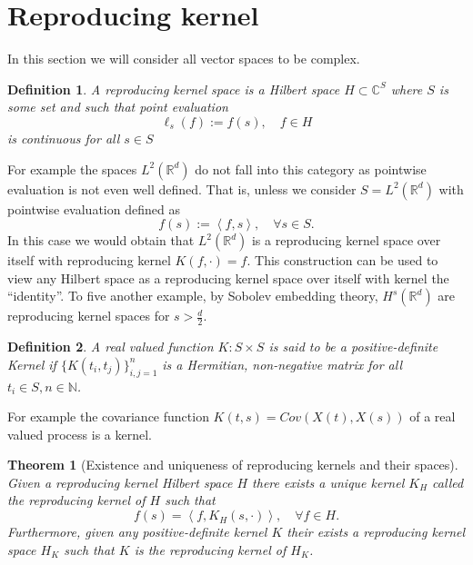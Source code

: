 \documentclass[12pt]{article}
\newcommand{\br}[1]{\left\langle#1\right\rangle}
\newcommand{\C}{\mathbb{C}}
\newcommand{\N}{\mathbb{N}}
\newcommand{\R}{{\mathbb R}}
\newtheorem{theorem}{Theorem}
\newtheorem{definition}{Definition}
\begin{document}
\section{Reproducing kernel}
In this section we will consider all vector spaces to be complex.
\begin{definition}
	A reproducing kernel space is a Hilbert space $H\subset \C^S$ where $S$ is some set and such that  point evaluation $$\ell _s(f):=f(s),\quad f\in H$$ is continuous for all $s\in S$
\end{definition}
For example the spaces $L^2(\R^d)$ do not fall into this category as pointwise evaluation is not even well defined. That is, unless we consider $S=L^2(\R^d)$ with pointwise evaluation defined as
\begin{equation*}
	f(s):=\br{f,s},\quad\forall s\in S.
\end{equation*}
In this case we would obtain that $L^2(\R^d)$ is a reproducing kernel space over itself with reproducing kernel $K(f,\cdot )=f.$ This construction can be used to view any Hilbert space as a reproducing kernel space over itself with kernel the ``identity''. To five another example, by Sobolev embedding theory, $H^s(\R^d)$ are reproducing kernel spaces for $s>\frac{d}{2}$.
\begin{definition}
	A real valued function $K:S\times S$ is said to be a positive-definite  Kernel if  $\{K(t_i,t_j)\}_{i,j=1}^n$ is a Hermitian, non-negative matrix for all $t_i \in S,n \in \N$.
\end{definition}
For example the covariance function $K(t,s)=Cov(X(t),X(s))$ of a real valued process is a kernel.
\begin{theorem}[Existence and uniqueness of reproducing kernels and their spaces]
	Given a reproducing kernel Hilbert space $H$ there exists a unique kernel $K_H$ called the \emph{reproducing kernel} of $H$ such that
	\begin{equation*}
		f(s)=\br{f,K_H(s,\cdot )},\quad\forall f\in H.
	\end{equation*}
	Furthermore, given any positive-definite kernel $K$ their exists a reproducing kernel space $H_K$ such that $K$ is the reproducing kernel of $H_K$.
\end{theorem}
\end{document}
